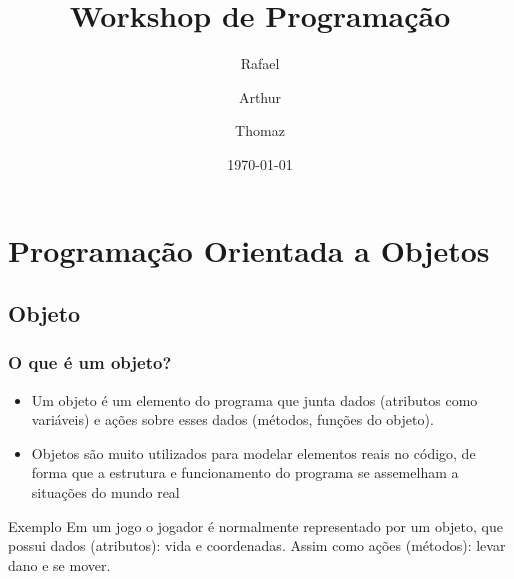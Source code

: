 \documentclass{beamer}
\title{Workshop de Programação}
\author{Rafael \and Arthur \and Thomaz}
\institute{Prisma Game Lab}
\date{\today}
\begin{document}
	\begin{frame}
		\titlepage
	\end{frame}

	\frame{\tableofcontents}

	\section{Programação Orientada a Objetos}
	\frame{\sectionpage}

	\subsection{Objeto}
	\begin{frame}
		\frametitle{O que é um objeto?}

		\begin{itemize}
			\item Um objeto é um elemento do programa que junta dados
				(atributos como variáveis) e ações sobre esses dados (métodos,
				funções do objeto).

			\item Objetos são muito utilizados para modelar elementos reais no
				código, de forma que a estrutura e funcionamento do programa se
				assemelham a situações do mundo real
		\end{itemize}

		\begin{block}{Exemplo}
			Em um jogo o jogador é normalmente representado por um objeto, que
			possui dados (atributos): vida e coordenadas. Assim como ações
			(métodos): levar dano e se mover.
		\end{block}
	\end{frame}
\end{document}
